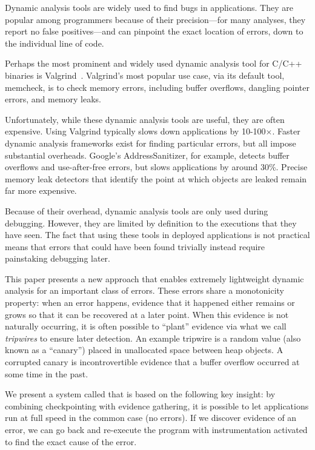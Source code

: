 
Dynamic analysis tools are widely used to find bugs in
applications. They are popular among programmers because of their
precision---for many analyses, they report no false positives---and
can pinpoint the exact location of errors, down to the individual line
of code.

Perhaps the most prominent and widely used dynamic analysis tool for
C/C++ binaries is Valgrind~\cite{overflow:valgrind}. Valgrind's most
popular use case, via its default tool, memcheck, is to check memory
errors, including buffer overflows, dangling pointer errors, and
memory leaks.

Unfortunately, while these dynamic analysis tools are useful, they are
often expensive. Using Valgrind typically slows down applications by
10-100$\times$. Faster dynamic analysis frameworks exist for finding
particular errors, but all impose substantial overheads. Google's
AddressSanitizer, for example, detects buffer overflows and
use-after-free errors, but slows applications by around 30\%. Precise
memory leak detectors that identify the point at which objects are
leaked remain far more expensive.

Because of their overhead, dynamic analysis tools are only used during
debugging. However, they are limited by definition to the executions
that they have seen. The fact that using these tools in deployed
applications is not practical means that errors that could
have been found trivially instead require painstaking debugging
later.

This paper presents a new approach that enables extremely lightweight
dynamic analysis for an important class of errors. These errors share
a monotonicity property: when an error happens, evidence that it
happened either remains or grows so that it can be recovered at a
later point. When this evidence is not naturally occurring, it is
often possible to ``plant'' evidence via what we call \emph{tripwires}
to ensure later detection. An example tripwire is a random value (also
known as a ``canary'') placed in unallocated space between heap
objects. A corrupted canary is incontrovertible evidence that a buffer
overflow occurred at some time in the past.

We present a system called \doubletake{} that is based on the
following key insight: by combining checkpointing with evidence
gathering, it is possible to let applications run at full speed in the
common case (no errors). If we discover evidence of an error, we can
go back and re-execute the program with instrumentation activated to
find the exact cause of the error.

